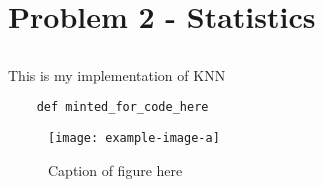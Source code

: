 \section{Problem 2 - Statistics}
\subsection{}

This is my implementation of KNN
\begin{verbatim}
    def minted_for_code_here
\end{verbatim}

\begin{figure}[H]
    \centering
    \texttt{[image: example-image-a]}
    \caption{Caption of figure here}
\end{figure}
